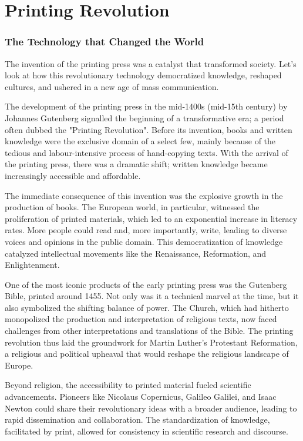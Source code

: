 \chapter{Printing Revolution}
\subsection*{The Technology that Changed the World}
The invention of the printing press was a catalyst that transformed society. Let's look at how this revolutionary technology democratized knowledge, reshaped cultures, and ushered in a new age of mass communication.

The development of the printing press in the mid-1400s (mid-15th century) by Johannes Gutenberg signalled the beginning of a transformative era; a period often dubbed the "Printing Revolution". Before its invention, books and written knowledge were the exclusive domain of a select few, mainly because of the tedious and labour-intensive process of hand-copying texts. With the arrival of the printing press, there was a dramatic shift; written knowledge became increasingly accessible and affordable.

The immediate consequence of this invention was the explosive growth in the production of books. The European world, in particular, witnessed the proliferation of printed materials, which led to an exponential increase in literacy rates. More people could read and, more importantly, write, leading to diverse voices and opinions in the public domain. This democratization of knowledge catalyzed intellectual movements like the Renaissance, Reformation, and Enlightenment.

One of the most iconic products of the early printing press was the Gutenberg Bible, printed around 1455. Not only was it a technical marvel at the time, but it also symbolized the shifting balance of power. The Church, which had hitherto monopolized the production and interpretation of religious texts, now faced challenges from other interpretations and translations of the Bible. The printing revolution thus laid the groundwork for Martin Luther's Protestant Reformation, a religious and political upheaval that would reshape the religious landscape of Europe.

Beyond religion, the accessibility to printed material fueled scientific advancements. Pioneers like Nicolaus Copernicus, Galileo Galilei, and Isaac Newton could share their revolutionary ideas with a broader audience, leading to rapid dissemination and collaboration. The standardization of knowledge, facilitated by print, allowed for consistency in scientific research and discourse.

